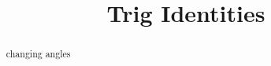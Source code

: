 \documentclass{ximera}
\title{Trig Identities}
\begin{document}
\begin{abstract}
changing angles
\end{abstract}
\maketitle
\end{document}
